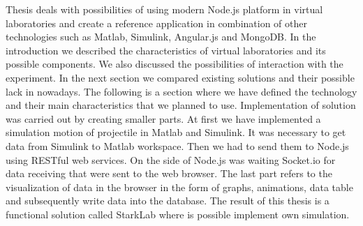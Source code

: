 Thesis deals with possibilities of using modern Node.js platform in virtual laboratories and create a reference application in combination of other technologies such as Matlab, Simulink, Angular.js and MongoDB. In the introduction we described the characteristics of virtual laboratories and its possible components. We also discussed the possibilities of interaction with the experiment. In the next section we compared existing solutions and their possible lack in nowadays. The following is a section where we have defined the technology and their main characteristics that we planned to use. Implementation of solution was carried out by creating smaller parts. At first we have implemented a simulation motion of projectile in Matlab and Simulink. It was necessary to get data from Simulink to Matlab workspace. Then we had to send them to Node.js using RESTful web services. On the side of Node.js was waiting Socket.io for data receiving that were sent to the web browser. The last part refers to the visualization of data in the browser in the form of graphs, animations, data table and subsequently write data into the database. The result of this thesis is a functional solution called StarkLab where is possible implement own simulation.